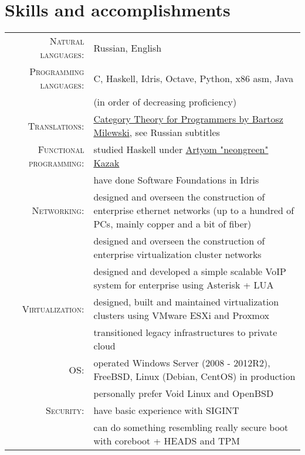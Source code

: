\documentclass[a4paper,11pt]{article}
\begin{document}
  \section{Skills and accomplishments}
    \begin{longtable}{rp{}}
      \textsc{Natural languages:} & Russian, English \\

      \textsc{Programming languages:} & C, Haskell, Idris, Octave, Python, x86 asm, Java \\
                                      & (in order of decreasing proficiency)             \\

      \textsc{Translations:} & \href{https://www.youtube.com/playlist?list=PLbgaMIhjbmEnaH\_LTkxLI7FMa2HsnawM\_}
                               {Category Theory for Programmers by Bartosz Milewski}, see Russian subtitles      \\

      \textsc{Functional programming:} & studied Haskell under \href{https://artyom.me}{Artyom "neongreen" Kazak} \\
                                       & have done Software Foundations in Idris                                  \\

      \textsc{Networking:} & designed and overseen the construction of enterprise ethernet
                             networks (up to a hundred of PCs, mainly copper and a bit of fiber) \\
                           & designed and overseen the construction of enterprise virtualization
                             cluster networks                                                    \\
                           & designed and developed a simple scalable VoIP system for enterprise
                             using Asterisk + LUA                                                \\

      \textsc{Virtualization:} & designed, built and maintained virtualization clusters using VMware ESXi and Proxmox \\
                               & transitioned legacy infrastructures to private cloud                                 \\

      \textsc{OS:} & operated Windows Server (2008 - 2012R2), FreeBSD, Linux (Debian, CentOS) in production \\
                   & personally prefer Void Linux and OpenBSD                                               \\

      \textsc{Security:} & have basic experience with SIGINT                                            \\
                         & can do something resembling really secure boot with coreboot + HEADS and TPM \\
    \end{longtable}
\end{document}
